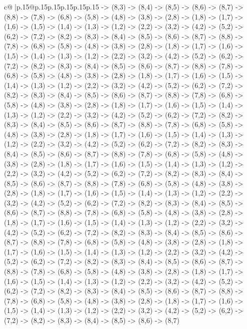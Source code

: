 \documentclass{article}
\begin{document}
{\begin{supertabular}{c@{$\;$}|p{.15\linewidth}@{}p{.15\linewidth}p{.15\linewidth}p{.15\linewidth}p{.15\linewidth}p{.15\linewidth}}
{{{{-}> (8,3) {-}> (8,4) {-}> (8,5) {-}> (8,6) {-}> (8,7) {-}> (8,8) {-}> (7,8) {-}> (6,8) {-}> (5,8) {-}> (4,8) {-}> (3,8) {-}> (2,8) {-}> (1,8) {-}> (1,7) {-}> (1,6) {-}> (1,5) {-}> (1,4) {-}> (1,3) {-}> (1,2) {-}> (2,2) {-}> (3,2) {-}> (4,2) {-}> (5,2) {-}> (6,2) {-}> (7,2) {-}> (8,2) {-}> (8,3) {-}> (8,4) {-}> (8,5) {-}> (8,6) {-}> (8,7) {-}> (8,8) {-}> (7,8) {-}> (6,8) {-}> (5,8) {-}> (4,8) {-}> (3,8) {-}> (2,8) {-}> (1,8) {-}> (1,7) {-}> (1,6) {-}> (1,5) {-}> (1,4) {-}> (1,3) {-}> (1,2) {-}> (2,2) {-}> (3,2) {-}> (4,2) {-}> (5,2) {-}> (6,2) {-}> (7,2) {-}> (8,2) {-}> (8,3) {-}> (8,4) {-}> (8,5) {-}> (8,6) {-}> (8,7) {-}> (8,8) {-}> (7,8) {-}> (6,8) {-}> (5,8) {-}> (4,8) {-}> (3,8) {-}> (2,8) {-}> (1,8) {-}> (1,7) {-}> (1,6) {-}> (1,5) {-}> (1,4) {-}> (1,3) {-}> (1,2) {-}> (2,2) {-}> (3,2) {-}> (4,2) {-}> (5,2) {-}> (6,2) {-}> (7,2) {-}> (8,2) {-}> (8,3) {-}> (8,4) {-}> (8,5) {-}> (8,6) {-}> (8,7) {-}> (8,8) {-}> (7,8) {-}> (6,8) {-}> (5,8) {-}> (4,8) {-}> (3,8) {-}> (2,8) {-}> (1,8) {-}> (1,7) {-}> (1,6) {-}> (1,5) {-}> (1,4) {-}> (1,3) {-}> (1,2) {-}> (2,2) {-}> (3,2) {-}> (4,2) {-}> (5,2) {-}> (6,2) {-}> (7,2) {-}> (8,2) {-}> (8,3) {-}> (8,4) {-}> (8,5) {-}> (8,6) {-}> (8,7) {-}> (8,8) {-}> (7,8) {-}> (6,8) {-}> (5,8) {-}> (4,8) {-}> (3,8) {-}> (2,8) {-}> (1,8) {-}> (1,7) {-}> (1,6) {-}> (1,5) {-}> (1,4) {-}> (1,3) {-}> (1,2) {-}> (2,2) {-}> (3,2) {-}> (4,2) {-}> (5,2) {-}> (6,2) {-}> (7,2) {-}> (8,2) {-}> (8,3) {-}> (8,4) {-}> (8,5) {-}> (8,6) {-}> (8,7) {-}> (8,8) {-}> (7,8) {-}> (6,8) {-}> (5,8) {-}> (4,8) {-}> (3,8) {-}> (2,8) {-}> (1,8) {-}> (1,7) {-}> (1,6) {-}> (1,5) {-}> (1,4) {-}> (1,3) {-}> (1,2) {-}> (2,2) {-}> (3,2) {-}> (4,2) {-}> (5,2) {-}> (6,2) {-}> (7,2) {-}> (8,2) {-}> (8,3) {-}> (8,4) {-}> (8,5) {-}> (8,6) {-}> (8,7) {-}> (8,8) {-}> (7,8) {-}> (6,8) {-}> (5,8) {-}> (4,8) {-}> (3,8) {-}> (2,8) {-}> (1,8) {-}> (1,7) {-}> (1,6) {-}> (1,5) {-}> (1,4) {-}> (1,3) {-}> (1,2) {-}> (2,2) {-}> (3,2) {-}> (4,2) {-}> (5,2) {-}> (6,2) {-}> (7,2) {-}> (8,2) {-}> (8,3) {-}> (8,4) {-}> (8,5) {-}> (8,6) {-}> (8,7) {-}> (8,8) {-}> (7,8) {-}> (6,8) {-}> (5,8) {-}> (4,8) {-}> (3,8) {-}> (2,8) {-}> (1,8) {-}> (1,7) {-}> (1,6) {-}> (1,5) {-}> (1,4) {-}> (1,3) {-}> (1,2) {-}> (2,2) {-}> (3,2) {-}> (4,2) {-}> (5,2) {-}> (6,2) {-}> (7,2) {-}> (8,2) {-}> (8,3) {-}> (8,4) {-}> (8,5) {-}> (8,6) {-}> (8,7) {-}> (8,8) {-}> (7,8) {-}> (6,8) {-}> (5,8) {-}> (4,8) {-}> (3,8) {-}> (2,8) {-}> (1,8) {-}> (1,7) {-}> (1,6) {-}> (1,5) {-}> (1,4) {-}> (1,3) {-}> (1,2) {-}> (2,2) {-}> (3,2) {-}> (4,2) {-}> (5,2) {-}> (6,2) {-}> (7,2) {-}> (8,2) {-}> (8,3) {-}> (8,4) {-}> (8,5) {-}> (8,6) {-}> (8,7) {-}> (8,8) {-}> (7,8) {-}> (6,8) {-}> (5,8) {-}> (4,8) {-}> (3,8) {-}> (2,8) {-}> (1,8) {-}> (1,7) {-}> (1,6) {-}> (1,5) {-}> (1,4) {-}> (1,3) {-}> (1,2) {-}> (2,2) {-}> (3,2) {-}> (4,2) {-}> (5,2) {-}> (6,2) {-}> (7,2) {-}> (8,2) {-}> (8,3) {-}> (8,4) {-}> (8,5) {-}> (8,6) {-}> (8,7) {-}> (8,8) {-}> (7,8) {-}> (6,8) {-}> (5,8) {-}> (4,8) {-}> (3,8) {-}> (2,8) {-}> (1,8) {-}> (1,7) {-}> (1,6) {-}> (1,5) {-}> (1,4) {-}> (1,3) {-}> (1,2) {-}> (2,2) {-}> (3,2) {-}> (4,2) {-}> (5,2) {-}> (6,2) {-}> (7,2) {-}> (8,2) {-}> (8,3) {-}> (8,4) {-}> (8,5) {-}> (8,6) {-}> (8,7) }}}
\end{supertabular}}
\end{document}

